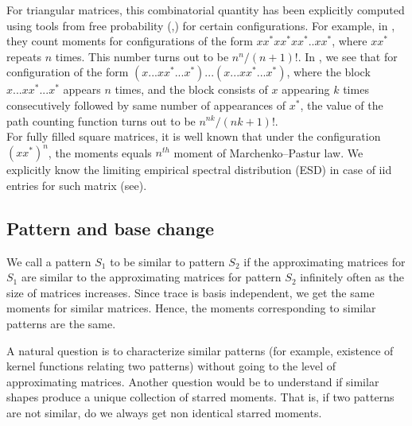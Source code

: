 \documentclass[12pt]{amsart}
\theoremstyle{definition}
\theoremstyle{remark}
\newcommand\red{\color{red}}
\begin{document}
For triangular matrices, this combinatorial quantity has been explicitly computed using tools from free probability (\cite{dykema},\cite{sniady}) for certain configurations. For example, in \cite{dykema}, they count moments for configurations of the form $xx^*xx^*xx^*..xx^*$, where $xx^*$ repeats $n$ times. This number turns out to be $n^n/(n+1)!$. In \cite{sniady}, we see that for configuration of the form  $(x...xx^*...x^*)...(x...xx^*...x^*)$, where the block $x...xx^*...x^*$ appears $n$ times, and the block consists of $x$ appearing $k$ times consecutively followed by same number of appearances of $x^*$, the value of the path counting function turns out to be $n^{nk}/(nk+1)!$. \\

For fully filled square matrices, it is well known that under the configuration $(xx^*)^n$, the moments equals $n^{th}$ moment of Marchenko–Pastur law. We explicitly know the limiting empirical spectral distribution (ESD) in case of iid entries for such matrix (see\cite{tao}). 


\subsection{Pattern and base change}

We call a pattern $S_1$ to be similar to pattern $S_2$ if the approximating matrices for $S_1$ are similar to the approximating matrices for pattern $S_2$ infinitely often as the size of matrices increases. Since trace is basis independent, we get the same moments for similar matrices. Hence, the moments corresponding to similar patterns are the same. \par

A natural question is to characterize similar patterns (for example, existence of kernel functions relating two patterns) without going to the level of approximating matrices. Another question would be to understand if similar shapes produce a unique collection of starred moments. That is, if two patterns are not similar, do we always get non identical starred moments.\\
\end{document}
